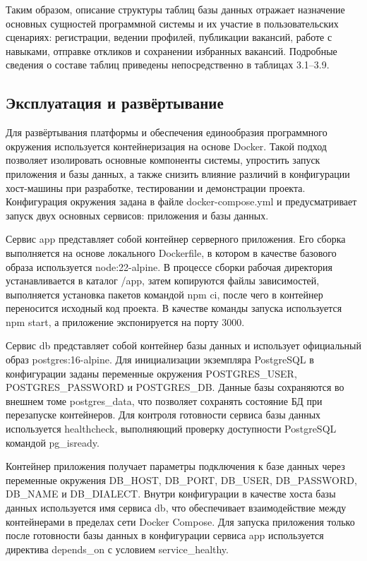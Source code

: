 \endgroup

Таким образом, описание структуры таблиц базы данных отражает назначение основных сущностей программной системы и их участие в пользовательских сценариях: регистрации, ведении профилей, публикации вакансий, работе с навыками, отправке откликов и сохранении избранных вакансий. Подробные сведения о составе таблиц приведены непосредственно в таблицах 3.1--3.9.

\subsection{Эксплуатация и развёртывание}

Для развёртывания платформы и обеспечения единообразия программного окружения используется контейнеризация на основе Docker. Такой подход позволяет изолировать основные компоненты системы, упростить запуск приложения и базы данных, а также снизить влияние различий в конфигурации хост-машины при разработке, тестировании и демонстрации проекта. Конфигурация окружения задана в файле docker-compose.yml и предусматривает запуск двух основных сервисов: приложения и базы данных.

Сервис app представляет собой контейнер серверного приложения. Его сборка выполняется на основе локального Dockerfile, в котором в качестве базового образа используется node:22-alpine. В процессе сборки рабочая директория устанавливается в каталог /app, затем копируются файлы зависимостей, выполняется установка пакетов командой npm ci, после чего в контейнер переносится исходный код проекта. В качестве команды запуска используется npm start, а приложение экспонируется на порту 3000.

Сервис db представляет собой контейнер базы данных и использует официальный образ postgres:16-alpine. Для инициализации экземпляра PostgreSQL в конфигурации заданы переменные окружения POSTGRES\_USER, POSTGRES\_PASSWORD и POSTGRES\_DB. Данные базы сохраняются во внешнем томе postgres\_data, что позволяет сохранять состояние БД при перезапуске контейнеров. Для контроля готовности сервиса базы данных используется healthcheck, выполняющий проверку доступности PostgreSQL командой pg\_isready.

Контейнер приложения получает параметры подключения к базе данных через переменные окружения DB\_HOST, DB\_PORT, DB\_USER, DB\_PASSWORD, DB\_NAME и DB\_DIALECT. Внутри конфигурации в качестве хоста базы данных используется имя сервиса db, что обеспечивает взаимодействие между контейнерами в пределах сети Docker Compose. Для запуска приложения только после готовности базы данных в конфигурации сервиса app используется директива depends\_on с условием service\_healthy.

